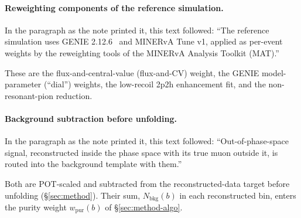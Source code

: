 \paragraph{Reweighting components of the reference simulation.} In the paragraph as the note printed it, this text followed: ``The reference simulation uses GENIE 2.12.6~\cite{Andreopoulos:2009rq} and MINERvA Tune v1, applied as per-event weights by the reweighting tools of the MINERvA Analysis Toolkit (MAT).''\par These are the flux-and-central-value (flux-and-CV) weight, the GENIE model-parameter (``dial'') weights, the low-recoil 2p2h enhancement fit, and the non-resonant-pion reduction.

\paragraph{Background subtraction before unfolding.} In the paragraph as the note printed it, this text followed: ``Out-of-phase-space signal, reconstructed inside the phase space with its true muon outside it, is routed into the background template with them.''\par Both are POT-scaled and subtracted from the reconstructed-data target before unfolding (\S\ref{sec:method}). Their sum, $N_{\mathrm{bkg}}(b)$ in each reconstructed bin, enters the purity weight $w_{\mathrm{pur}}(b)$ of \S\ref{sec:method-algo}.

